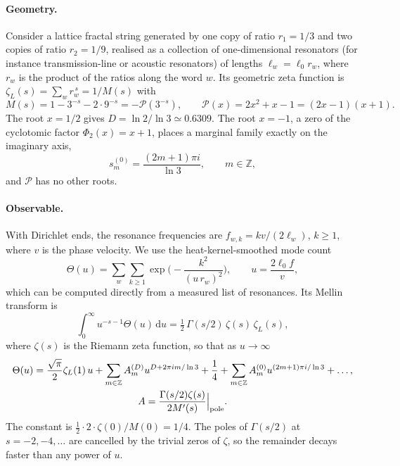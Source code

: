 \documentclass[11pt]{article}
\theoremstyle{definition}\newtheorem{definition}{Definition}[section]
\theoremstyle{remark}\newtheorem*{remark}{Remark}
\newcommand{\ZZ}{\mathbb{Z}}
\newcommand{\dd}{\mathrm{d}}
\begin{document}
\paragraph{Geometry.} Consider a lattice fractal string generated by one copy of ratio $r_1=1/3$ and two
copies of ratio $r_2=1/9$, realised as a collection of one-dimensional resonators (for instance
transmission-line or acoustic resonators) of lengths $\ell_w=\ell_0r_w$, where $r_w$ is the product of the
ratios along the word $w$. Its geometric zeta function is $\zeta_L(s)=\sum_wr_w^{\,s}=1/M(s)$ with
\begin{equation}
M(s)=1-3^{-s}-2\cdot9^{-s}=-\mathcal P(3^{-s}),\qquad \mathcal P(x)=2x^2+x-1=(2x-1)(x+1).
\end{equation}
The root $x=1/2$ gives $D=\ln2/\ln3\simeq0.6309$. The root $x=-1$, a zero of the cyclotomic factor
$\Phi_2(x)=x+1$, places a marginal family exactly on the imaginary axis,
\begin{equation}
s_m^{(0)}=\frac{(2m+1)\pi i}{\ln3},\qquad m\in\ZZ ,
\end{equation}
and $\mathcal P$ has no other roots.

\paragraph{Observable.} With Dirichlet ends, the resonance frequencies are $f_{w,k}=kv/(2\ell_w)$,
$k\ge1$, where $v$ is the phase velocity. We use the heat-kernel-smoothed mode count
\begin{equation}
\Theta(u)=\sum_w\sum_{k\ge1}\exp\!\Big(-\frac{k^2}{(u\,r_w)^2}\Big),\qquad u=\frac{2\ell_0f}{v},
\end{equation}
which can be computed directly from a measured list of resonances. Its Mellin transform is
\begin{equation}
\int_0^\infty u^{-s-1}\Theta(u)\,\dd u=\tfrac12\,\Gamma(s/2)\,\zeta(s)\,\zeta_L(s),
\end{equation}
where $\zeta(s)$ is the Riemann zeta function, so that as $u\to\infty$
\begin{equation}
\begin{gathered}
\Theta(u)=\frac{\sqrt\pi}{2}\zeta_L(1)\,u+\sum_{m\in\ZZ}A_m^{(D)}u^{D+2\pi im/\ln3}+\frac14
+\sum_{m\in\ZZ}A_m^{(0)}u^{(2m+1)\pi i/\ln3}+\dots,\\
A=\frac{\Gamma(s/2)\zeta(s)}{2M'(s)}\Big|_{\rm pole}.
\end{gathered}
\label{eq:resonator}
\end{equation}
The constant is $\tfrac12\cdot2\cdot\zeta(0)/M(0)=1/4$. The poles of $\Gamma(s/2)$ at $s=-2,-4,\dots$ are
cancelled by the trivial zeros of $\zeta$, so the remainder decays faster than any power of $u$.
\end{document}
